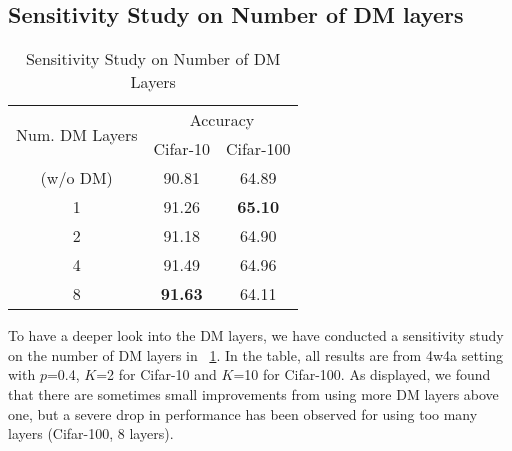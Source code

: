 \documentclass{article}
\newcommand{\rev}[1]{{\color{olivegreen}#1}}
\renewcommand{\rev}[1]{#1}
\begin{document}
\rev{
\subsection{Sensitivity Study on Number of DM layers}
\begin{table}[h]
\rev{
    \centering


    \caption{Sensitivity Study on Number of DM Layers}
    \label{tab:dmlayer}
    


    \begin{tabular}{ccc}
    \toprule
    \multirow{2}{*}{Num. DM Layers} & \multicolumn{2}{c}{Accuracy} \\
    \cmidrule(lr){2-3}
    & Cifar-10 & Cifar-100 \\
      \midrule
    (w/o DM) &  90.81 & 64.89 \\
     1 & 91.26 & \textbf{65.10} \\
     2 & 91.18 & 64.90 \\
     4 & 91.49 & 64.96 \\
     8 & \textbf{91.63} & 64.11 \\
      \bottomrule
      
    \end{tabular} 
    }
\end{table}
To have a deeper look into the DM layers, we have conducted a sensitivity study on the number of DM layers in \tablename~\ref{tab:dmlayer}.
In the table, all results are from 4w4a setting with $p$=0.4, $K$=2 for Cifar-10 and $K$=10 for Cifar-100. As displayed, we found that there are sometimes small improvements from using more DM layers above one, but a severe drop in performance has been observed for using too many layers (Cifar-100, 8 layers).


}
\end{document}
